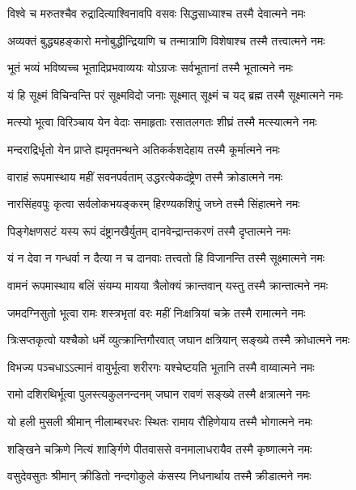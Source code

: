 \twolineshloka
{विश्वे च मरुतश्चैव रुद्रादित्याश्विनावपि}
{वसवः सिद्धसाध्याश्च तस्मै देवात्मने नमः} %


\twolineshloka
{अव्यक्तं बुद्ध्यहङ्कारो मनोबुद्धीन्द्रियाणि च}
{तन्मात्राणि विशेषाश्च तस्मै तत्त्वात्मने नमः} %


\twolineshloka
{भूतं भव्यं भविष्यच्च भूतादिप्रभवाव्ययः}
{योऽग्रजः सर्वभूतानां तस्मै भूतात्मने नमः} %


\twolineshloka
{यं हि सूक्ष्मं विचिन्वन्ति परं सूक्ष्मविदो जनाः}
{सूक्ष्मात् सूक्ष्मं च यद् ब्रह्म तस्मै सूक्ष्मात्मने नमः} %


\twolineshloka
{मत्स्यो भूत्वा विरिञ्चाय येन वेदाः समाहृताः}
{रसातलगतः शीघ्रं तस्मै मत्स्यात्मने नमः} %


\twolineshloka
{मन्दराद्रिर्धृतो येन प्राप्ते ह्यमृतमन्थने}
{अतिकर्कशदेहाय तस्मै कूर्मात्मने नमः} %


\twolineshloka
{वाराहं रूपमास्थाय महीं सवनपर्वताम्}
{उद्धरत्येकदंष्ट्रेण तस्मै क्रोडात्मने नमः} %


\twolineshloka
{नारसिंहवपुः कृत्वा सर्वलोकभयङ्करम्}
{हिरण्यकशिपुं जघ्ने तस्मै सिंहात्मने नमः} %


\twolineshloka
{पिङ्गेक्षणसटं यस्य रूपं दंष्ट्रानखैर्युतम्}
{दानवेन्द्रान्तकरणं तस्मै दृप्तात्मने नमः} %


\twolineshloka
{यं न देवा न गन्धर्वा न दैत्या न च दानवाः}
{तत्त्वतो हि विजानन्ति तस्मै सूक्ष्मात्मने नमः} %


\twolineshloka
{वामनं रूपमास्थाय बलिं संयम्य मायया}
{त्रैलोक्यं क्रान्तवान् यस्तु तस्मै क्रान्तात्मने नमः} %


\twolineshloka
{जमदग्निसुतो भूत्वा रामः शस्त्रभृतां वरः}
{महीं निःक्षत्रियां चक्रे तस्मै रामात्मने नमः} %


\twolineshloka
{त्रिःसप्तकृत्वो यश्चैको धर्मे व्युत्क्रान्तिगौरवात्}
{जघान क्षत्रियान् सङ्ख्ये तस्मै क्रोधात्मने नमः} %


\twolineshloka
{विभज्य पञ्चधाऽऽत्मानं वायुर्भूत्वा शरीरगः}
{यश्चेष्टयति भूतानि तस्मै वाय्वात्मने नमः} %


\twolineshloka
{रामो दशिरथिर्भूत्वा पुलस्त्यकुलनन्दनम्}
{जघान रावणं सङ्ख्ये तस्मै क्षत्रात्मने नमः} %


\twolineshloka
{यो हली मुसली श्रीमान् नीलाम्बरधरः स्थितः}
{रामाय रौहिणेयाय तस्मै भोगात्मने नमः} %


\twolineshloka
{शङ्खिने चक्रिणे नित्यं शार्ङ्गिणे पीतवाससे}
{वनमालाधरायैव तस्मै कृष्णात्मने नमः} %


\twolineshloka
{वसुदेवसुतः श्रीमान् क्रीडितो नन्दगोकुले}
{कंसस्य निधनार्थाय तस्मै क्रीडात्मने नमः} %


